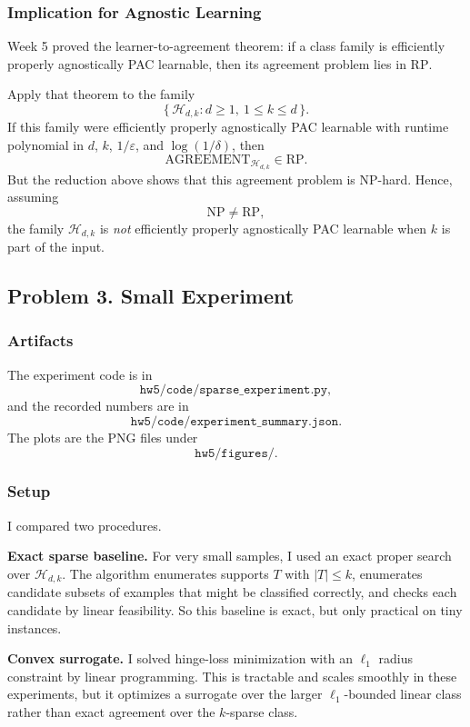 \documentclass{article}
\newcommand{\cH}{\mathcal{H}}
\begin{document}
\subsubsection{Implication for Agnostic Learning}

Week 5 proved the learner-to-agreement theorem: if a class family is efficiently properly agnostically PAC learnable, then its agreement problem lies in $\mathrm{RP}$.

Apply that theorem to the family
$$
\{\,\cH_{d,k} : d\ge 1,\ 1\le k\le d\,\}.
$$
If this family were efficiently properly agnostically PAC learnable with runtime polynomial in $d$, $k$, $1/\varepsilon$, and $\log(1/\delta)$, then
$$
\mathrm{AGREEMENT}_{\cH_{d,k}} \in \mathrm{RP}.
$$
But the reduction above shows that this agreement problem is NP-hard. Hence, assuming
$$
\mathrm{NP}\neq \mathrm{RP},
$$
the family $\cH_{d,k}$ is \emph{not} efficiently properly agnostically PAC learnable when $k$ is part of the input.

\subsection{Problem 3. Small Experiment}

\subsubsection{Artifacts}

The experiment code is in
$$
\texttt{hw5/code/sparse\_experiment.py},
$$
and the recorded numbers are in
$$
\texttt{hw5/code/experiment\_summary.json}.
$$
The plots are the PNG files under
$$
\texttt{hw5/figures/}.
$$

\subsubsection{Setup}

I compared two procedures.

\textbf{Exact sparse baseline.}
For very small samples, I used an exact proper search over $\cH_{d,k}$. The algorithm enumerates supports $T$ with $|T|\le k$, enumerates candidate subsets of examples that might be classified correctly, and checks each candidate by linear feasibility. So this baseline is exact, but only practical on tiny instances.

\textbf{Convex surrogate.}
I solved hinge-loss minimization with an $\ell_1$ radius constraint by linear programming. This is tractable and scales smoothly in these experiments, but it optimizes a surrogate over the larger $\ell_1$-bounded linear class rather than exact agreement over the $k$-sparse class.
\end{document}

